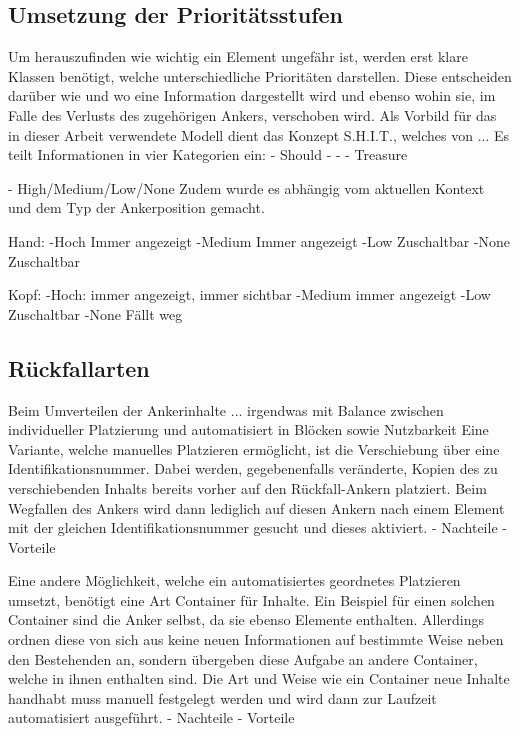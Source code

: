 		\subsection{Umsetzung der Prioritätsstufen}
			Um herauszufinden wie wichtig ein Element ungefähr ist, werden erst klare Klassen benötigt, welche unterschiedliche Prioritäten darstellen. Diese entscheiden darüber wie und wo eine Information dargestellt wird und ebenso wohin sie, im Falle des Verlusts des zugehörigen Ankers, verschoben wird.
			Als Vorbild für das in dieser Arbeit verwendete Modell dient das Konzept S.H.I.T., welches von ...
			Es teilt Informationen in vier  Kategorien ein:
			- Should
			- 
			-
			- Treasure
			
			
			- High/Medium/Low/None
			Zudem wurde es abhängig vom aktuellen Kontext und dem Typ der Ankerposition gemacht.
			
			Hand:
			-Hoch Immer angezeigt
			-Medium Immer angezeigt
			-Low Zuschaltbar
			-None Zuschaltbar 
			
			Kopf:
			-Hoch: immer angezeigt, immer sichtbar
			-Medium immer angezeigt
			-Low Zuschaltbar
			-None Fällt weg
			
		\subsection{Rückfallarten}
			Beim Umverteilen der Ankerinhalte ... irgendwas mit Balance zwischen individueller Platzierung und automatisiert in Blöcken sowie Nutzbarkeit
			Eine Variante, welche manuelles Platzieren ermöglicht, ist die Verschiebung über eine Identifikationsnummer. Dabei werden, gegebenenfalls veränderte, Kopien des zu verschiebenden Inhalts bereits vorher auf den Rückfall-Ankern platziert. Beim Wegfallen des Ankers wird dann lediglich auf diesen Ankern nach einem Element mit der gleichen Identifikationsnummer gesucht und dieses aktiviert. - Nachteile - Vorteile 
			
			
			Eine andere Möglichkeit, welche ein automatisiertes geordnetes Platzieren umsetzt, benötigt eine Art Container für Inhalte. Ein Beispiel für einen solchen Container sind die Anker selbst, da sie ebenso Elemente enthalten. Allerdings ordnen diese von sich aus keine neuen Informationen auf bestimmte Weise neben den Bestehenden an, sondern übergeben diese Aufgabe an andere Container, welche in ihnen enthalten sind. Die Art und Weise wie ein Container neue Inhalte handhabt muss manuell festgelegt werden und wird dann zur Laufzeit automatisiert ausgeführt. - Nachteile - Vorteile 
			
